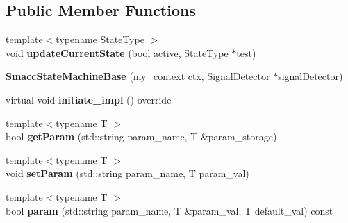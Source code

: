 \subsection*{Public Member Functions}
\begin{DoxyCompactItemize}
\item 
\hypertarget{structsmacc_1_1SmaccStateMachineBase_a0a172afd49d485bbc4e008ccff410683}{{\footnotesize template$<$typename State\-Type $>$ }\\void {\bfseries update\-Current\-State} (bool active, State\-Type $\ast$test)}\label{structsmacc_1_1SmaccStateMachineBase_a0a172afd49d485bbc4e008ccff410683}

\item 
\hypertarget{structsmacc_1_1SmaccStateMachineBase_a47508a2d301007546d4c70dedd2ade4b}{{\bfseries Smacc\-State\-Machine\-Base} (my\-\_\-context ctx, \hyperlink{classsmacc_1_1SignalDetector}{Signal\-Detector} $\ast$signal\-Detector)}\label{structsmacc_1_1SmaccStateMachineBase_a47508a2d301007546d4c70dedd2ade4b}

\item 
\hypertarget{structsmacc_1_1SmaccStateMachineBase_a2dc1cd9a25b80f00602f1faab9b01e7b}{virtual void {\bfseries initiate\-\_\-impl} () override}\label{structsmacc_1_1SmaccStateMachineBase_a2dc1cd9a25b80f00602f1faab9b01e7b}

\item 
\hypertarget{structsmacc_1_1SmaccStateMachineBase_a5529364d7f90edb802221536402e838a}{{\footnotesize template$<$typename T $>$ }\\bool {\bfseries get\-Param} (std\-::string param\-\_\-name, T \&param\-\_\-storage)}\label{structsmacc_1_1SmaccStateMachineBase_a5529364d7f90edb802221536402e838a}

\item 
\hypertarget{structsmacc_1_1SmaccStateMachineBase_a30d76661005a2bdff68c802cdab42fcf}{{\footnotesize template$<$typename T $>$ }\\void {\bfseries set\-Param} (std\-::string param\-\_\-name, T param\-\_\-val)}\label{structsmacc_1_1SmaccStateMachineBase_a30d76661005a2bdff68c802cdab42fcf}

\item 
\hypertarget{structsmacc_1_1SmaccStateMachineBase_a31ee021c0be206b9bfcce5c3e38ed15c}{{\footnotesize template$<$typename T $>$ }\\bool {\bfseries param} (std\-::string param\-\_\-name, T \&param\-\_\-val, T default\-\_\-val) const }\label{structsmacc_1_1SmaccStateMachineBase_a31ee021c0be206b9bfcce5c3e38ed15c}


\end{DoxyCompactItemize}
